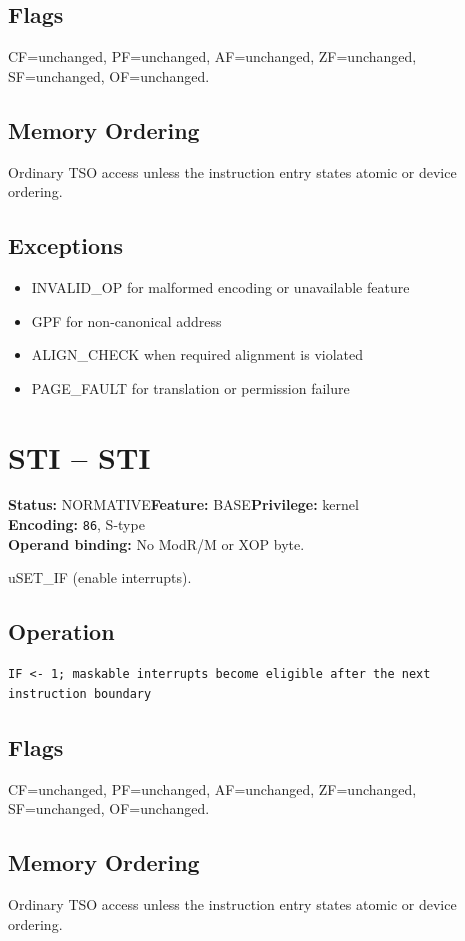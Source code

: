 \documentclass[10pt]{article}
\begin{document}
\subsection*{Flags}
CF=unchanged, PF=unchanged, AF=unchanged, ZF=unchanged, SF=unchanged, OF=unchanged.
\subsection*{Memory Ordering}
Ordinary TSO access unless the instruction entry states atomic or device ordering.
\subsection*{Exceptions}
\begin{itemize}
\item INVALID\_OP for malformed encoding or unavailable feature
\item GPF for non-canonical address
\item ALIGN\_CHECK when required alignment is violated
\item PAGE\_FAULT for translation or permission failure
\end{itemize}
\clearpage

\section{STI -- STI}
\textbf{Status:} NORMATIVE\quad \textbf{Feature:} BASE\quad \textbf{Privilege:} kernel\\
\textbf{Encoding:} \texttt{86}, S-type\\
\textbf{Operand binding:} No ModR/M or XOP byte.

uSET\_IF (enable interrupts).

\subsection*{Operation}
\begin{lstlisting}
IF <- 1; maskable interrupts become eligible after the next instruction boundary
\end{lstlisting}
\subsection*{Flags}
CF=unchanged, PF=unchanged, AF=unchanged, ZF=unchanged, SF=unchanged, OF=unchanged.
\subsection*{Memory Ordering}
Ordinary TSO access unless the instruction entry states atomic or device ordering.
\end{document}
